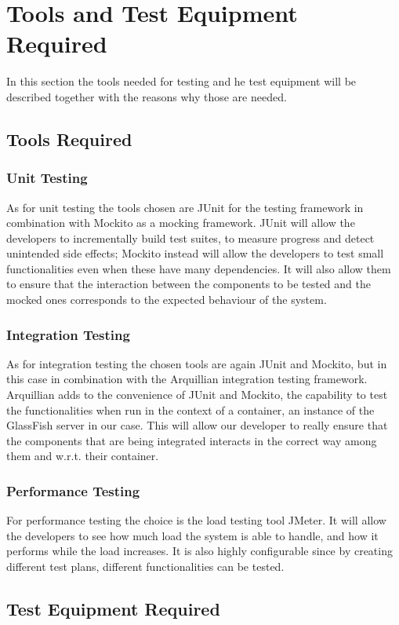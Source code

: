 \section{Tools and Test Equipment Required}

In this section the tools needed for testing and he test equipment will be described together with the reasons why those are needed.

\subsection{Tools Required}

\subsubsection{Unit Testing}
As for unit testing the tools chosen are JUnit for the testing framework in combination with Mockito as a mocking framework.
JUnit will allow the developers to incrementally build test suites, to measure progress and detect unintended side effects; Mockito instead will allow the developers to test small functionalities even when these have many dependencies. It will also allow them to ensure that the interaction between the components to be tested and the mocked ones corresponds to the expected behaviour of the system.

\subsubsection{Integration Testing}
As for integration testing the chosen tools are again JUnit and Mockito, but in this case in combination with the Arquillian integration testing framework.
Arquillian adds to the convenience of JUnit and Mockito, the capability to test the functionalities when run in the context of a container, an instance of the GlassFish server in our case. This will allow our developer to really ensure that the components that are being integrated interacts in the correct way among them and w.r.t. their container.

\subsubsection{Performance Testing}
For performance testing the choice is the load testing tool JMeter. It will allow the developers to see how much load the system is able to handle, and how it performs while the load increases. It is also highly configurable since by creating different test plans, different functionalities can be tested.

\subsection{Test Equipment Required}


